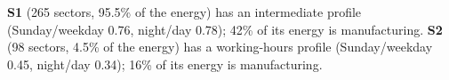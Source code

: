 \textbf{S1} (265 sectors, 95.5\% of the energy) has an intermediate profile (Sunday/weekday 0.76, night/day 0.78); 42\% of its energy is manufacturing. \textbf{S2} (98 sectors, 4.5\% of the energy) has a working-hours profile (Sunday/weekday 0.45, night/day 0.34); 16\% of its energy is manufacturing.
